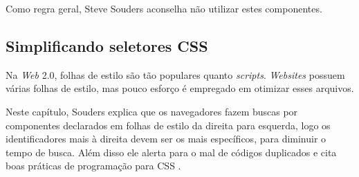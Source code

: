 Como regra geral, Steve Souders aconselha não utilizar estes componentes.

\subsection{Simplificando seletores CSS}
\label{subsec:evenfaster_cap14}
Na \textit{Web} 2.0, folhas de estilo são tão populares quanto \textit{scripts}. \textit{Websites} possuem várias folhas de estilo, mas pouco esforço é empregado em otimizar esses arquivos.

Neste capítulo, Souders explica que os navegadores fazem buscas por componentes declarados em folhas de estilo da direita para esquerda, logo os identificadores mais à direita devem ser os mais específicos, para diminuir o tempo de busca. Além disso ele alerta para o mal de códigos duplicados e cita boas práticas de programação para CSS \cite[p.~195]{EvenFaster}.
